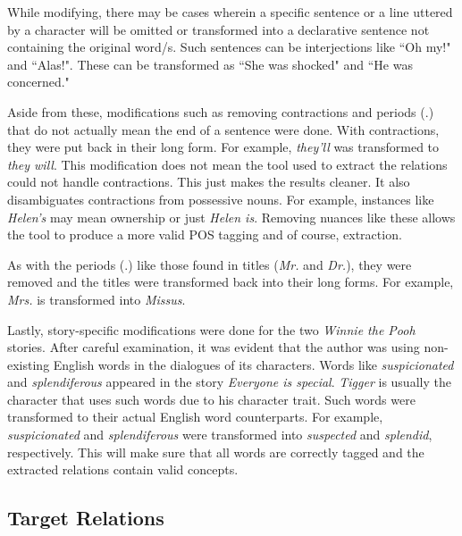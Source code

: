 While modifying, there may be cases wherein a specific sentence or a line uttered by a character will be omitted or transformed into a declarative sentence not containing the original word/s. Such sentences can be interjections like ``Oh my!" and ``Alas!". These can be transformed as ``She was shocked" and ``He was concerned."

Aside from these, modifications such as removing contractions and periods (.) that do not actually mean the end of a sentence were done. With contractions, they were put back in their long form. For example, \textit{they'll} was transformed to \textit{they will}. This modification does not mean the tool used to extract the relations could not handle contractions. This just makes the results cleaner. It also disambiguates contractions from possessive nouns. For example, instances like \textit{Helen's} may mean ownership or just \textit{Helen is}. Removing nuances like these allows the tool to produce a more valid POS tagging and of course, extraction. 

As with the periods (.) like those found in titles (\textit{Mr.} and \textit{Dr.}), they were removed and the titles were transformed back into their long forms. For example, \textit{Mrs.} is transformed into \textit{Missus}. 

Lastly, story-specific modifications were done for the two \textit{Winnie the Pooh} stories. After careful examination, it was evident that the author was using non-existing English words in the dialogues of its characters. Words like \textit{suspicionated} and \textit{splendiferous} appeared in the story \textit{Everyone is special}. \textit{Tigger} is usually the character that uses such words due to his character trait. Such words were transformed to their actual English word counterparts. For example, \textit{suspicionated} and \textit{splendiferous} were transformed into \textit{suspected} and \textit{splendid}, respectively. This will make sure that all words are correctly tagged and the extracted relations contain valid concepts.

\subsection{Target Relations}
\label{sec:relations}


